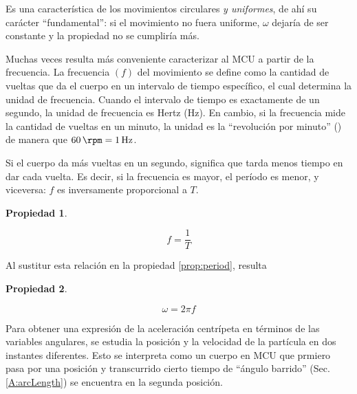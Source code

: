 \documentclass[a5paper,12pt,twoside]{book}
\newtheorem{prop}{{Propiedad}}[chapter]
\begin{document}
Es una característica de los movimientos circulares \emph{y uniformes}, de ahí su carácter ``fundamental'':
si el movimiento no fuera uniforme, $\omega$ dejaría de ser constante y la propiedad no se cumpliría más.

Muchas veces resulta más conveniente caracterizar al MCU a partir de la frecuencia.
La frecuencia $(f)$ del movimiento se define como la cantidad de vueltas que da el cuerpo en un intervalo de tiempo específico, el cual determina la unidad de frecuencia.
Cuando el intervalo de tiempo es exactamente de un segundo, la unidad de frecuencia es Hertz (\si{\hertz}).
En cambio, si la frecuencia mide la cantidad de vueltas en un minuto, la unidad es la ``revolución por minuto'' (\si{\rpm}) de manera que $\SI{60}{\rpm} = \SI{1}{\hertz}$.

Si el cuerpo da más vueltas en un segundo, significa que tarda menos tiempo en dar cada vuelta.
Es decir, si la frecuencia es mayor, el período es menor, y viceversa: $f$ es inversamente proporcional a $T$.

\begin{mdframed}[style=MyFrame1]
    \begin{prop}
    \end{prop}
    \begin{equation*}
        f = \dfrac{1}{T}
    \end{equation*}
\end{mdframed}

Al sustitur esta relación en la propiedad \ref{prop:period}, resulta

\begin{mdframed}[style=MyFrame1]
    \begin{prop}
    \end{prop}
    \begin{equation*}
        \omega = 2 \pi f
    \end{equation*}
\end{mdframed}

Para obtener una expresión de la aceleración centrípeta en términos de las variables angulares, se estudia la posición y la velocidad de la partícula en dos instantes diferentes. Esto se interpreta como un cuerpo en MCU que prmiero pasa por una posición y transcurrido cierto tiempo de ``ángulo barrido'' (Sec. \ref{A:arcLength}) se encuentra en la segunda posición. 

\begin{center}
    \vspace{-6cm}
    \def\svgwidth{\linewidth}
    
    \vspace{-6cm}
\end{center}
\end{document}
